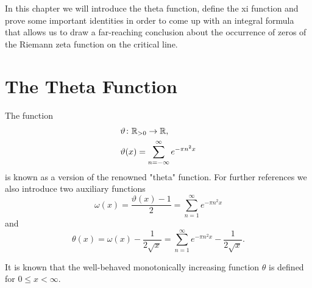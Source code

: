 In this chapter we will introduce the theta function, define the xi function and prove some important identities in order to come up with an integral formula that allows us to draw a far-reaching conclusion about the occurrence of zeros of the Riemann zeta function on the critical line.


\section{The Theta Function}


\begin{definition}
	The function
\begin{equation*}
\begin{aligned}
	&\vartheta \colon \mathbb{R}_{> 0} \to \mathbb{R}, \\
	&\vartheta(x) = \sum _{n = -\infty} ^{\infty} e^{-\pi n^2 x}
\end{aligned}
\end{equation*}
	is known as a version of the renowned "theta" function. For further references we also introduce two auxiliary functions
\begin{equation*}
	\omega(x) = \frac{\vartheta(x) - 1}{2} = \sum _{n = 1} ^{\infty} e^{-\pi n^2 x}
\end{equation*}
	and
\begin{equation*}
	\theta(x) = \omega(x) - \frac{1}{2 \sqrt{x}} = \sum _{n = 1} ^{\infty} e^{-\pi n^2 x} - \frac{1}{2 \sqrt{x}}.
\end{equation*}
\end{definition}


\begin{remark}
	It is known that the well-behaved monotonically increasing function $\theta$ is defined for $0 \leq x < \infty$.
\end{remark}


